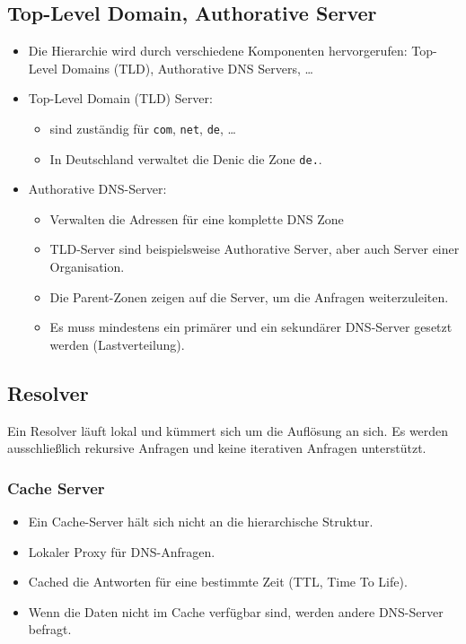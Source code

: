 \documentclass[a4paper, 11pt, accentcolor = tud3b]{tudreport}
\begin{document}
            \subsection{Top-Level Domain, Authorative Server}
                \begin{itemize}
                	\item Die Hierarchie wird durch verschiedene Komponenten hervorgerufen: Top-Level Domains (TLD), Authorative DNS Servers, \dots
                	\item Top-Level Domain (TLD) Server:
	                	\begin{itemize}
	                		\item sind zuständig für \texttt{com}, \texttt{net}, \texttt{de}, \dots
	                		\item In Deutschland verwaltet die Denic die Zone \texttt{de.}.
	                	\end{itemize}
	                \item Authorative DNS-Server:
		                \begin{itemize}
		                	\item Verwalten die Adressen für eine komplette DNS Zone
		                	\item TLD-Server sind beispielsweise Authorative Server, aber auch Server einer Organisation.
		                	\item Die Parent-Zonen zeigen auf die Server, um die Anfragen weiterzuleiten.
		                	\item Es muss mindestens ein primärer und ein sekundärer DNS-Server gesetzt werden (Lastverteilung).
		                \end{itemize}
                \end{itemize}

            \subsection{Resolver}
                Ein Resolver läuft lokal und kümmert sich um die Auflösung an sich. Es werden ausschließlich rekursive Anfragen und keine iterativen Anfragen unterstützt.

                \subsubsection{Cache Server}
                    \begin{itemize}
                    	\item Ein Cache-Server hält sich nicht an die hierarchische Struktur.
                    	\item Lokaler Proxy für DNS-Anfragen.
                    	\item Cached die Antworten für eine bestimmte Zeit (TTL, Time To Life).
                    	\item Wenn die Daten nicht im Cache verfügbar sind, werden andere DNS-Server befragt.
                    \end{itemize}
\end{document}

